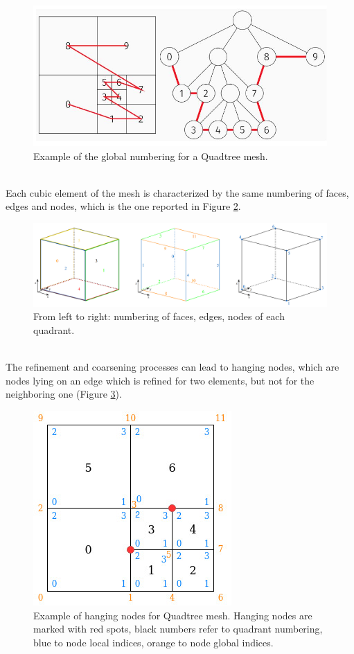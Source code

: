 \documentclass{Configuration_Files/PoliMi3i_thesis}
\begin{document}
\begin{figure}[h!]
    \centering
    \includegraphics[scale=0.5]{Images/quadtree.JPG}
    \caption {Example of the global numbering for a Quadtree mesh.}
    \label{fig: z}
\end{figure}
\\Each cubic element of the mesh is characterized by the same numbering of faces, edges and nodes, which is the one reported in Figure \ref{fig: enum}.
\begin{figure}[h!]
    \centering
    \includegraphics[scale=0.2]{Images/enum}
    \caption {From left to right: numbering of faces, edges, nodes of each quadrant.}
    \label{fig: enum}
\end{figure}
\\The refinement and coarsening processes can lead to hanging nodes, which are nodes lying on an edge which is refined for two elements, but not for the neighboring one (Figure \ref{fig: hanging}).
\begin{figure}[h!]
    \centering
    \includegraphics[scale=0.6]{Images/hanging.jpg}
    \caption {Example of hanging nodes for Quadtree mesh. Hanging nodes are marked with red spots, black numbers refer to quadrant numbering, blue to node local indices, orange to node global indices.}
    \label{fig: hanging}
\end{figure}
\end{document}
